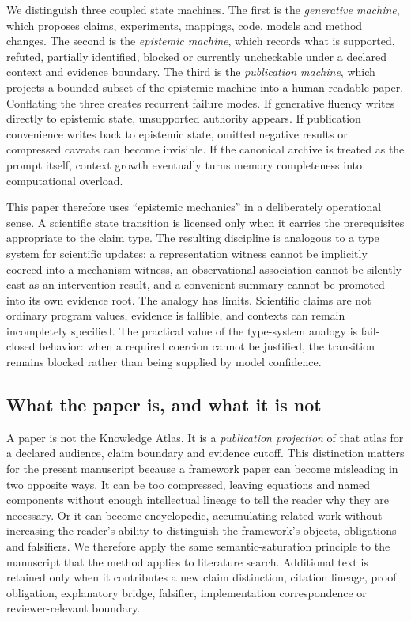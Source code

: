 We distinguish three coupled state machines. The first is the \emph{generative machine}, which proposes claims, experiments, mappings, code, models and method changes. The second is the \emph{epistemic machine}, which records what is supported, refuted, partially identified, blocked or currently uncheckable under a declared context and evidence boundary. The third is the \emph{publication machine}, which projects a bounded subset of the epistemic machine into a human-readable paper. Conflating the three creates recurrent failure modes. If generative fluency writes directly to epistemic state, unsupported authority appears. If publication convenience writes back to epistemic state, omitted negative results or compressed caveats can become invisible. If the canonical archive is treated as the prompt itself, context growth eventually turns memory completeness into computational overload.

This paper therefore uses ``epistemic mechanics'' in a deliberately operational sense. A scientific state transition is licensed only when it carries the prerequisites appropriate to the claim type. The resulting discipline is analogous to a type system for scientific updates: a representation witness cannot be implicitly coerced into a mechanism witness, an observational association cannot be silently cast as an intervention result, and a convenient summary cannot be promoted into its own evidence root. The analogy has limits. Scientific claims are not ordinary program values, evidence is fallible, and contexts can remain incompletely specified. The practical value of the type-system analogy is fail-closed behavior: when a required coercion cannot be justified, the transition remains blocked rather than being supplied by model confidence.

\subsection{What the paper is, and what it is not}

A paper is not the Knowledge Atlas. It is a \emph{publication projection} of that atlas for a declared audience, claim boundary and evidence cutoff. This distinction matters for the present manuscript because a framework paper can become misleading in two opposite ways. It can be too compressed, leaving equations and named components without enough intellectual lineage to tell the reader why they are necessary. Or it can become encyclopedic, accumulating related work without increasing the reader's ability to distinguish the framework's objects, obligations and falsifiers. We therefore apply the same semantic-saturation principle to the manuscript that the method applies to literature search. Additional text is retained only when it contributes a new claim distinction, citation lineage, proof obligation, explanatory bridge, falsifier, implementation correspondence or reviewer-relevant boundary.

